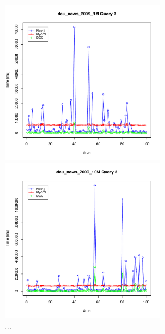 \documentclass[11pt, a4paper, oneside]{article} %
\begin{document}
\begin{appendix}
\begin{figure}[ht]
\begin{minipage}[hbt]{7cm}
	\centering
	\includegraphics[width=7cm]{../results/cold caches/images/1M_query3_perf}
	\caption{...}
	\label{fig:1M_query3_perf}
\end{minipage}
\hfill
\begin{minipage}[hbt]{7cm}
	\centering
	\includegraphics[width=7cm]{../results/cold caches/images/10M_query3_perf}
	\caption{...}
	\label{fig:10M_query3_perf}
\end{minipage}
\end{figure}

\end{appendix}
\end{document}
